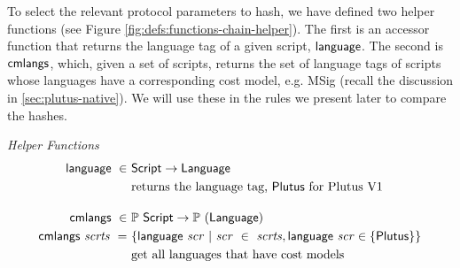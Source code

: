 To select the relevant protocol parameters to hash, we have defined two helper
functions (see Figure \ref{fig:defs:functions-chain-helper}). The first
is an accessor function that returns the language tag of a given script, $\mathsf{language}$.
The second is $\mathsf{cmlangs}$, which, given a set of scripts, returns the set
of language tags of scripts whose languages have a corresponding cost model,
e.g. MSig (recall the discussion in \ref{sec:plutus-native}).
We will use these in the rules we present later to compare the hashes.

\begin{figure*}[htb]
  \emph{Helper Functions}
  \begin{align*}
    \fun{language} ~\in~& \Script \to \Language \\
    &\text{returns the language tag, $\Plutus$ for Plutus V1}
    \nextdef
    \fun{cmlangs} ~\in~& \powerset{\Script} \to \powerset{(\Language)} \\
    \fun{cmlangs}~ \var{scrts} ~=~ & \{ \fun{language}~\var{scr} ~\vert~
      \var{scr}~\in~ \var{scrts}, \fun{language}~\var{scr} \in \{\Plutus\}  \}\\
    &\text{get all languages that have cost models}
  \end{align*}
  \caption{Languages and Plutus Versions}
  \label{fig:defs:functions-chain-helper}
\end{figure*}
